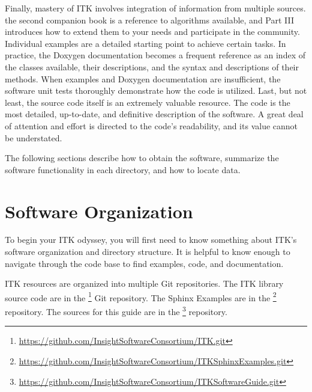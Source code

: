 Finally, mastery of ITK involves integration of information from multiple
sources. the second companion book is a reference to algorithms available, and
Part III introduces how to extend them to your needs and participate in the
community. Individual examples are a detailed starting point to achieve
certain tasks.  In practice, the Doxygen documentation becomes a frequent
reference as an index of the classes available, their descriptions, and the
syntax and descriptions of their methods. When examples and Doxygen
documentation are insufficient, the software unit tests thoroughly demonstrate
how the code is utilized. Last, but not least, the source code itself
is an extremely valuable resource. The code is the most detailed, up-to-date, and
definitive description of the software. A great deal of attention and effort
is directed to the code's readability, and its value cannot be understated.

The following sections describe how to obtain the software, summarize the
software functionality in each directory, and how to locate data.

\section{Software Organization}%
\label{sec:SoftwareOrganization}

To begin your ITK odyssey, you will first need to know something about
ITK's software organization and directory structure. It is helpful to
know enough to navigate through the code base to find examples, code,
and documentation.

ITK resources are organized into multiple Git repositories. The ITK library source
code are in the \footnote{\url{https://github.com/InsightSoftwareConsortium/ITK.git}} Git
repository. The Sphinx Examples are in the
\footnote{\url{https://github.com/InsightSoftwareConsortium/ITKSphinxExamples.git}} repository.
The sources for this guide are in the
\footnote{\url{https://github.com/InsightSoftwareConsortium/ITKSoftwareGuide.git}}
repository.

